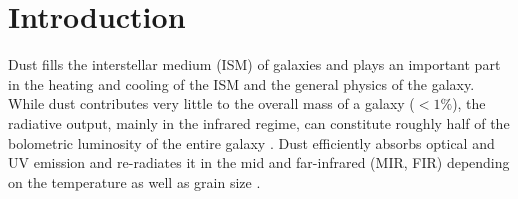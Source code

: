 \section{Introduction}\label{sec:intro}
Dust fills the interstellar medium (ISM) of galaxies and plays an important part in the heating and cooling of the ISM and the general physics of the galaxy. While dust contributes very little to the overall mass of a galaxy ($<1\%$), the radiative output, mainly in the infrared regime, can constitute roughly half of the bolometric luminosity of the entire galaxy \citep{Hauser_2001, Boselli_2003, Dale:2007fk, Burgarella_2013}. Dust efficiently absorbs optical and UV emission and re-radiates it in the mid and far-infrared (MIR, FIR) depending on the temperature as well as grain size \citep{Draine:2003gd}.     
  